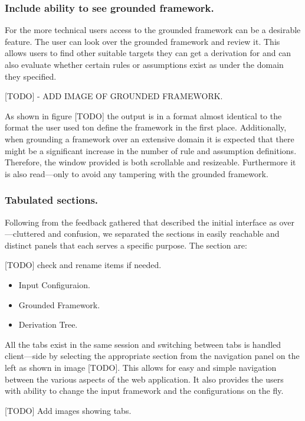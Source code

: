 \subsubsection{Include ability to see grounded framework.}
For the more technical users access to the grounded framework can be a desirable feature. The user can look over the grounded framework and review it. This allows users to find other suitable targets they can get a derivation for and can also evaluate whether certain rules or assumptions exist as under the domain they specified.

[TODO] - ADD IMAGE OF GROUNDED FRAMEWORK.

As shown in figure [TODO] the output is in a format almost identical to the format the user used ton define the framework in the first place. Additionally, when grounding a framework over an extensive domain it is expected that there might be a significant increase in the number of rule and assumption definitions. Therefore, the window provided is both scrollable and resizeable. Furthermore it is also read---only to avoid any tampering with the grounded framework.

\subsubsection{Tabulated sections.}
Following from the feedback gathered that described the initial interface as over---cluttered and confusion, we separated the sections in easily reachable and distinct panels that each serves a specific purpose. The section are:

[TODO] check and rename items if needed.

\begin{itemize}
\item Input Configuraion.
\item Grounded Framework.
\item Derivation Tree.
\end{itemize}

All the tabs exist in the same session and switching between tabs is handled client---side by selecting the appropriate section from the navigation panel on the left as shown in image [TODO]. This allows for easy and simple navigation between the various aspects of the web application. It also provides the users with ability to change the input framework and the configurations on the fly.

[TODO] Add images showing tabs.

